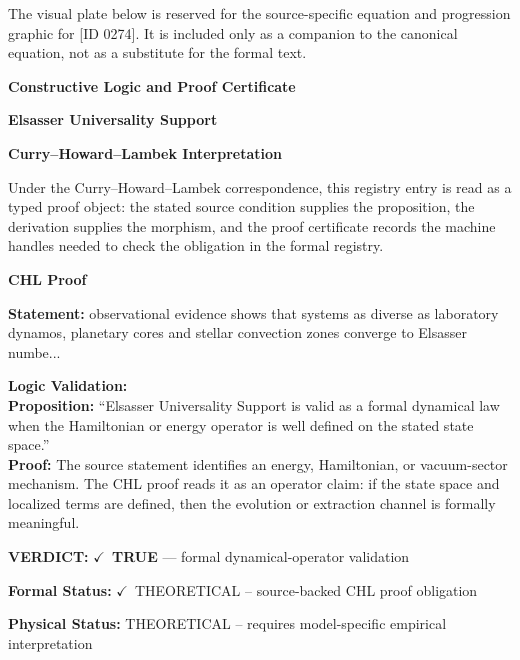 \begingroup\footnotesize\sloppy
The visual plate below is reserved for the source-specific equation and progression graphic for [ID 0274]. It is included only as a companion to the canonical equation, not as a substitute for the formal text.
\par\endgroup
\ifTZPDarkEdition
{}
\fi

\clearpage
\begingroup\tzpsupportsetup
\noindent\textbf{\fontsize{10.8pt}{12.8pt}\selectfont [ID 0274] Constructive Logic and Proof Certificate}\par
\noindent\textbf{\fontsize{10pt}{12pt}\selectfont Elsasser Universality Support}\par
\vspace{0.45em}
\begingroup
\footnotesize
\setlength{\parskip}{0.22em}
\setlength{\parindent}{0pt}
\noindent\textbf{Curry--Howard--Lambek Interpretation}\par
Under the Curry--Howard--Lambek correspondence, this registry entry is read as a typed proof
object: the stated source condition supplies the proposition, the derivation supplies the
morphism, and the proof certificate records the machine handles needed to check the obligation
in the formal registry.

\vspace{0.45em}
\noindent\textbf{CHL Proof}\par
\textbf{Statement:} observational evidence shows that systems as diverse as laboratory dynamos, planetary
cores and stellar convection zones converge to Elsasser numbe...

\textbf{Logic Validation:}\\
\textbf{Proposition:} ``Elsasser Universality Support is valid as a formal dynamical law when the Hamiltonian or
energy operator is well defined on the stated state space.''\\
\textbf{Proof:} The source statement identifies an energy, Hamiltonian, or vacuum-sector mechanism. The
CHL proof reads it as an operator claim: if the state space and localized terms are
defined, then the evolution or extraction channel is formally meaningful.

\textbf{VERDICT:} \ensuremath{\checkmark}\ \textbf{TRUE} --- formal dynamical-operator validation

\textbf{Formal Status:} \ensuremath{\checkmark}\ THEORETICAL -- source-backed CHL proof obligation

\textbf{Physical Status:} THEORETICAL -- requires model-specific empirical interpretation
\par\vspace{0.45em}
\par
\ifTZPDarkEdition
{}
\fi
\endgroup
\endgroup
